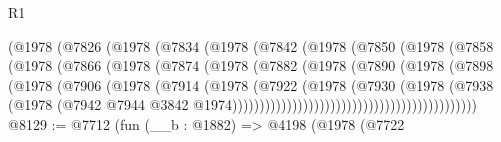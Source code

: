 \begin{lexlean}{R1}
\begin{coremodule}
                              (@1978
                                (@7826
                                  (@1978
                                    (@7834
                                      (@1978
                                        (@7842
                                          (@1978
                                            (@7850
                                              (@1978
                                                (@7858
                                                  (@1978
                                                    (@7866
                                                      (@1978
                                                        (@7874
                                                          (@1978
                                                            (@7882
                                                              (@1978
                                                                (@7890
                                                                  (@1978
                                                                    (@7898
                                                                      (@1978
                                                                        (@7906
                                                                          (@1978
                                                                            (@7914
                                                                              (@1978
                                                                                (@7922
                                                                                  (@1978
                                                                                    (@7930
                                                                                      (@1978
                                                                                        (@7938
                                                                                          (@1978
                                                                                            (@7942
                                                                                              @7944
                                                                                              @3842
                                                                                              @1974)))))))))))))))))))))))))))))))))))))))))))))
@8129 := @7712
    (fun (__b : @1882) =>
    @4198
      (@1978
        (@7722

\end{coremodule}
\end{lexlean}
